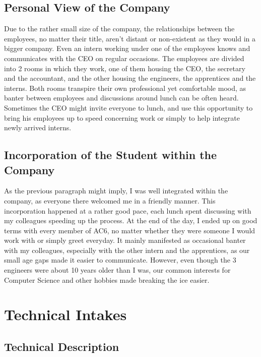 \documentclass[12pt]{article}
\begin{document}
\subsection{Personal View of the Company}

Due to the rather small size of the company, the relationships between the employees, no matter their title, aren't distant or non-existent as they would in a bigger company. Even an intern working under one of the employees knows and communicates with the CEO on regular occasions. The employees are divided into 2 rooms in which they work, one of them housing the CEO, the secretary and the accountant, and the other housing the engineers, the apprentices and the interns. Both rooms transpire their own professional yet comfortable mood, as banter between employees and discussions around lunch can be often heard. Sometimes the CEO might invite everyone to lunch, and use this opportunity to bring his employees up to speed concerning work or simply to help integrate newly arrived interns.

\subsection{Incorporation of the Student within the Company}

As the previous paragraph might imply, I was well integrated within the company, as everyone there welcomed me in a friendly manner. This incorporation happened at a rather good pace, each lunch spent discussing with my colleagues speeding up the process. At the end of the day, I ended up on good terms with every member of AC6, no matter whether they were someone I would work with or simply greet everyday. It mainly manifested as occasional banter with my colleagues, especially with the other intern and the apprentices, as our small age gaps made it easier to communicate. However, even though the 3 engineers were about 10 years older than I was, our common interests for Computer Science and other hobbies made breaking the ice easier. 

\section{Technical Intakes}

\subsection{Technical Description}
\end{document}
